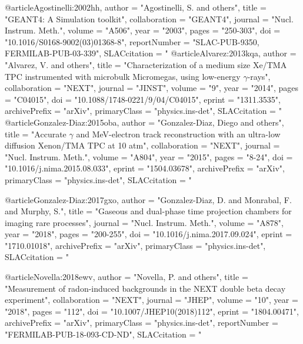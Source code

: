@article{Agostinelli:2002hh,
      author         = "Agostinelli, S. and others",
      title          = "{GEANT4: A Simulation toolkit}",
      collaboration  = "GEANT4",
      journal        = "Nucl. Instrum. Meth.",
      volume         = "A506",
      year           = "2003",
      pages          = "250-303",
      doi            = "10.1016/S0168-9002(03)01368-8",
      reportNumber   = "SLAC-PUB-9350, FERMILAB-PUB-03-339",
      SLACcitation   = "%
}
@article{Alvarez:2013kqa,
      author         = "Alvarez, V. and others",
      title          = "{Characterization of a medium size Xe/TMA TPC
                        instrumented with microbulk Micromegas, using low-energy
                        $\gamma$-rays}",
      collaboration  = "NEXT",
      journal        = "JINST",
      volume         = "9",
      year           = "2014",
      pages          = "C04015",
      doi            = "10.1088/1748-0221/9/04/C04015",
      eprint         = "1311.3535",
      archivePrefix  = "arXiv",
      primaryClass   = "physics.ins-det",
      SLACcitation   = "%
}
@article{Gonzalez-Diaz:2015oba,
      author         = "Gonzalez-Diaz, Diego and others",
      title          = "{Accurate $\gamma$ and MeV-electron track reconstruction
                        with an ultra-low diffusion Xenon/TMA TPC at 10 atm}",
      collaboration  = "NEXT",
      journal        = "Nucl. Instrum. Meth.",
      volume         = "A804",
      year           = "2015",
      pages          = "8-24",
      doi            = "10.1016/j.nima.2015.08.033",
      eprint         = "1504.03678",
      archivePrefix  = "arXiv",
      primaryClass   = "physics.ins-det",
      SLACcitation   = "%
}

@article{Gonzalez-Diaz:2017gxo,
      author         = "Gonzalez-Diaz, D. and Monrabal, F. and Murphy, S.",
      title          = "{Gaseous and dual-phase time projection chambers for
                        imaging rare processes}",
      journal        = "Nucl. Instrum. Meth.",
      volume         = "A878",
      year           = "2018",
      pages          = "200-255",
      doi            = "10.1016/j.nima.2017.09.024",
      eprint         = "1710.01018",
      archivePrefix  = "arXiv",
      primaryClass   = "physics.ins-det",
      SLACcitation   = "%
}

@article{Novella:2018ewv,
      author         = "Novella, P. and others",
      title          = "{Measurement of radon-induced backgrounds in the NEXT
                        double beta decay experiment}",
      collaboration  = "NEXT",
      journal        = "JHEP",
      volume         = "10",
      year           = "2018",
      pages          = "112",
      doi            = "10.1007/JHEP10(2018)112",
      eprint         = "1804.00471",
      archivePrefix  = "arXiv",
      primaryClass   = "physics.ins-det",
      reportNumber   = "FERMILAB-PUB-18-093-CD-ND",
      SLACcitation   = "%
}



